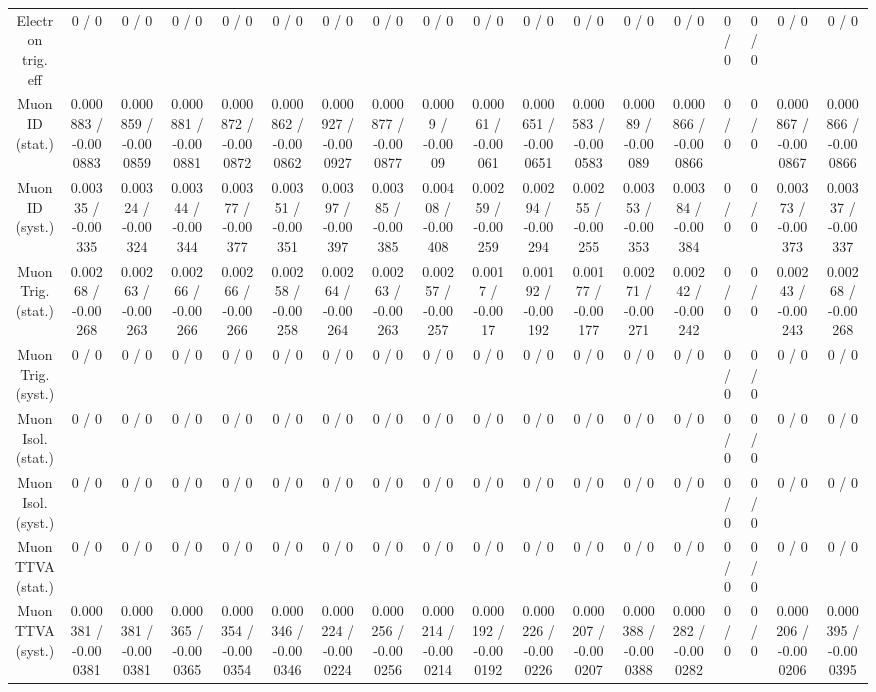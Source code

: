 \documentclass[10pt]{article}
\begin{document}
\begin{table}[htbp]
\begin{center}
\begin{tabular}{|c|c|c|c|c|c|c|c|c|c|c|c|c|c|c|c|c|c|}
  Electron trig. eff & 0 / 0 & 0 / 0 & 0 / 0 & 0 / 0 & 0 / 0 & 0 / 0 & 0 / 0 & 0 / 0 & 0 / 0 & 0 / 0 & 0 / 0 & 0 / 0 & 0 / 0 & 0 / 0 & 0 / 0 & 0 / 0 & 0 / 0 \\ 
  Muon ID (stat.) & 0.000883 / -0.000883 & 0.000859 / -0.000859 & 0.000881 / -0.000881 & 0.000872 / -0.000872 & 0.000862 / -0.000862 & 0.000927 / -0.000927 & 0.000877 / -0.000877 & 0.0009 / -0.0009 & 0.00061 / -0.00061 & 0.000651 / -0.000651 & 0.000583 / -0.000583 & 0.00089 / -0.00089 & 0.000866 / -0.000866 & 0 / 0 & 0 / 0 & 0.000867 / -0.000867 & 0.000866 / -0.000866 \\ 
  Muon ID (syst.) & 0.00335 / -0.00335 & 0.00324 / -0.00324 & 0.00344 / -0.00344 & 0.00377 / -0.00377 & 0.00351 / -0.00351 & 0.00397 / -0.00397 & 0.00385 / -0.00385 & 0.00408 / -0.00408 & 0.00259 / -0.00259 & 0.00294 / -0.00294 & 0.00255 / -0.00255 & 0.00353 / -0.00353 & 0.00384 / -0.00384 & 0 / 0 & 0 / 0 & 0.00373 / -0.00373 & 0.00337 / -0.00337 \\ 
  Muon Trig. (stat.) & 0.00268 / -0.00268 & 0.00263 / -0.00263 & 0.00266 / -0.00266 & 0.00266 / -0.00266 & 0.00258 / -0.00258 & 0.00264 / -0.00264 & 0.00263 / -0.00263 & 0.00257 / -0.00257 & 0.0017 / -0.0017 & 0.00192 / -0.00192 & 0.00177 / -0.00177 & 0.00271 / -0.00271 & 0.00242 / -0.00242 & 0 / 0 & 0 / 0 & 0.00243 / -0.00243 & 0.00268 / -0.00268 \\ 
  Muon Trig. (syst.) & 0 / 0 & 0 / 0 & 0 / 0 & 0 / 0 & 0 / 0 & 0 / 0 & 0 / 0 & 0 / 0 & 0 / 0 & 0 / 0 & 0 / 0 & 0 / 0 & 0 / 0 & 0 / 0 & 0 / 0 & 0 / 0 & 0 / 0 \\ 
  Muon Isol. (stat.) & 0 / 0 & 0 / 0 & 0 / 0 & 0 / 0 & 0 / 0 & 0 / 0 & 0 / 0 & 0 / 0 & 0 / 0 & 0 / 0 & 0 / 0 & 0 / 0 & 0 / 0 & 0 / 0 & 0 / 0 & 0 / 0 & 0 / 0 \\ 
  Muon Isol. (syst.) & 0 / 0 & 0 / 0 & 0 / 0 & 0 / 0 & 0 / 0 & 0 / 0 & 0 / 0 & 0 / 0 & 0 / 0 & 0 / 0 & 0 / 0 & 0 / 0 & 0 / 0 & 0 / 0 & 0 / 0 & 0 / 0 & 0 / 0 \\ 
  Muon TTVA (stat.) & 0 / 0 & 0 / 0 & 0 / 0 & 0 / 0 & 0 / 0 & 0 / 0 & 0 / 0 & 0 / 0 & 0 / 0 & 0 / 0 & 0 / 0 & 0 / 0 & 0 / 0 & 0 / 0 & 0 / 0 & 0 / 0 & 0 / 0 \\ 
  Muon TTVA (syst.) & 0.000381 / -0.000381 & 0.000381 / -0.000381 & 0.000365 / -0.000365 & 0.000354 / -0.000354 & 0.000346 / -0.000346 & 0.000224 / -0.000224 & 0.000256 / -0.000256 & 0.000214 / -0.000214 & 0.000192 / -0.000192 & 0.000226 / -0.000226 & 0.000207 / -0.000207 & 0.000388 / -0.000388 & 0.000282 / -0.000282 & 0 / 0 & 0 / 0 & 0.000206 / -0.000206 & 0.000395 / -0.000395 \\ 

\end{tabular}
\end{center}
\end{table}
\end{document}
